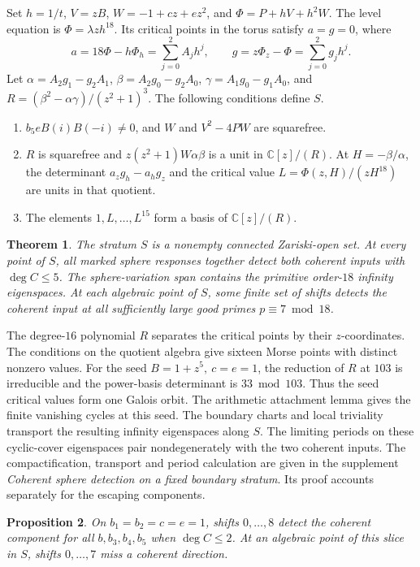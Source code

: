 \documentclass[11pt]{article}
\newtheorem{theorem}{Theorem}
\newtheorem{proposition}[theorem]{Proposition}
\begin{document}
Set \(h=1/t\), \(V=zB\), \(W=-1+cz+ez^2\), and
\(\Phi=P+hV+h^2W\). The level equation is
\(\Phi=\lambda zh^{18}\). Its critical points in the torus
satisfy \(a=g=0\), where
\[
 a=18\Phi-h\Phi_h=\sum_{j=0}^2 A_j h^j,\qquad
 g=z\Phi_z-\Phi=\sum_{j=0}^2 g_j h^j .
\]
Let \(\alpha=A_2g_1-g_2A_1\), \(\beta=A_2g_0-g_2A_0\),
\(\gamma=A_1g_0-g_1A_0\), and
\(R=(\beta^2-\alpha\gamma)/(z^2+1)^3\).
The following conditions define \(S\).
\begin{enumerate}
\item \(b_5eB(i)B(-i)\ne0\), and \(W\) and \(V^2-4PW\) are squarefree.
\item \(R\) is squarefree and \(z(z^2+1)W\alpha\beta\) is a unit
in \(\mathbb C[z]/(R)\). At \(H=-\beta/\alpha\), the determinant
\(a_z g_h-a_h g_z\) and the critical value
\(L=\Phi(z,H)/(zH^{18})\) are units in that quotient.
\item The elements \(1,L,\ldots,L^{15}\) form a basis of
\(\mathbb C[z]/(R)\).
\end{enumerate}

\begin{theorem}\label{thm:fixed-boundary-stratum}
The stratum \(S\) is a nonempty connected Zariski-open set.
At every point of \(S\), all marked sphere responses together
detect both coherent inputs with \(\deg C\le5\).
The sphere-variation span contains the primitive order-\(18\)
infinity eigenspaces. At each algebraic point of \(S\), some
finite set of shifts detects the coherent input at all sufficiently
large good primes \(p\equiv7\bmod18\).
\end{theorem}

The degree-\(16\) polynomial \(R\) separates the critical points by
their \(z\)-coordinates. The conditions on the quotient algebra give
sixteen Morse points with distinct nonzero values. For the seed
\(B=1+z^5,\ c=e=1\), the reduction of \(R\) at \(103\) is
irreducible and the power-basis determinant is \(33\bmod103\).
Thus the seed critical values form one Galois orbit. The arithmetic
attachment lemma gives the finite vanishing cycles at this seed.
The boundary charts and local triviality transport the resulting
infinity eigenspaces along \(S\). The limiting periods on these
cyclic-cover eigenspaces pair nondegenerately with the two coherent
inputs. The compactification, transport and period calculation are
given in the supplement \emph{Coherent sphere detection on a fixed
boundary stratum}. Its proof accounts separately for the escaping
components.

\begin{proposition}\label{prop:sharp-ninth-row}
On \(b_1=b_2=c=e=1\), shifts \(0,\ldots,8\) detect the
coherent component for all \(b,b_3,b_4,b_5\) when \(\deg C\le2\).
At an algebraic point of this slice in \(S\), shifts
\(0,\ldots,7\) miss a coherent direction.
\end{proposition}
\end{document}
